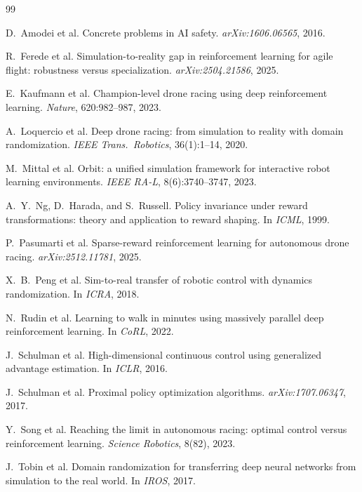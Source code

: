 \documentclass[10pt, twocolumn]{article}
\begin{document}
{\footnotesize
\begin{thebibliography}{99}
\itemsep 0pt

 D.~Amodei et al. Concrete problems in AI safety.
\emph{arXiv:1606.06565}, 2016.

 R.~Ferede et al. Simulation-to-reality gap in
reinforcement learning for agile flight: robustness versus specialization.
\emph{arXiv:2504.21586}, 2025.

 E.~Kaufmann et al. Champion-level drone racing using
deep reinforcement learning. \emph{Nature}, 620:982--987, 2023.

 A.~Loquercio et al. Deep drone racing: from simulation
to reality with domain randomization. \emph{IEEE Trans.\ Robotics},
36(1):1--14, 2020.

 M.~Mittal et al. Orbit: a unified simulation framework
for interactive robot learning environments. \emph{IEEE RA-L},
8(6):3740--3747, 2023.

 A.~Y.~Ng, D.~Harada, and S.~Russell. Policy invariance under
reward transformations: theory and application to reward shaping. In
\emph{ICML}, 1999.

 P.~Pasumarti et al. Sparse-reward reinforcement
learning for autonomous drone racing. \emph{arXiv:2512.11781}, 2025.

 X.~B.~Peng et al. Sim-to-real transfer of robotic control
with dynamics randomization. In \emph{ICRA}, 2018.

 N.~Rudin et al. Learning to walk in minutes using
massively parallel deep reinforcement learning. In \emph{CoRL}, 2022.

 J.~Schulman et al. High-dimensional continuous control
using generalized advantage estimation. In \emph{ICLR}, 2016.

 J.~Schulman et al. Proximal policy optimization
algorithms. \emph{arXiv:1707.06347}, 2017.

 Y.~Song et al. Reaching the limit in autonomous racing:
optimal control versus reinforcement learning. \emph{Science Robotics}, 8(82),
2023.

 J.~Tobin et al. Domain randomization for transferring deep
neural networks from simulation to the real world. In \emph{IROS}, 2017.

\end{thebibliography}
}
\end{document}
